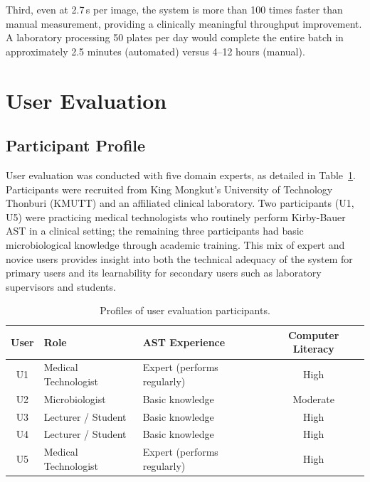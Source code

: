 Third, even at 2.7\,s per image, the system is more than 100 times faster
than manual measurement, providing a clinically meaningful throughput improvement.
A laboratory processing 50 plates per day would complete the entire batch
in approximately 2.5 minutes (automated) versus 4--12 hours (manual).

\section{User Evaluation}
\label{sec:user_evaluation}

\subsection{Participant Profile}

User evaluation was conducted with five domain experts, as detailed in Table~\ref{tab:user_profile}.
Participants were recruited from King Mongkut's University of Technology Thonburi (KMUTT)
and an affiliated clinical laboratory.
Two participants (U1, U5) were practicing medical technologists who routinely
perform Kirby-Bauer AST in a clinical setting;
the remaining three participants had basic microbiological knowledge
through academic training.
This mix of expert and novice users provides insight into both
the technical adequacy of the system for primary users
and its learnability for secondary users such as laboratory supervisors and students.

\begin{table}[H]
  \centering
  \caption{Profiles of user evaluation participants.}
  \label{tab:user_profile}
  \begin{tabular}{cllc}
    \toprule
    \textbf{User} & \textbf{Role} & \textbf{AST Experience} & \textbf{Computer Literacy} \\
    \midrule
    U1 & Medical Technologist & Expert (performs regularly) & High \\
    U2 & Microbiologist        & Basic knowledge            & Moderate \\
    U3 & Lecturer / Student    & Basic knowledge            & High \\
    U4 & Lecturer / Student    & Basic knowledge            & High \\
    U5 & Medical Technologist  & Expert (performs regularly) & High \\
    \bottomrule
  \end{tabular}
\end{table}

